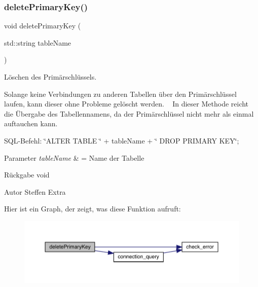 \subsubsection{delete\+Primary\+Key()}
{\footnotesize\ttfamily void delete\+Primary\+Key (\begin{DoxyParamCaption}\item[{std\+::string}]{table\+Name }\end{DoxyParamCaption})}



Löschen des Primärschlüssels. 

Solange keine Verbindungen zu anderen Tabellen über den Primärschlüssel laufen, kann dieser ohne Probleme gelöscht werden. ~\newline
 In dieser Methode reicht die Übergabe des Tabellennamens, da der Primärschlüssel nicht mehr als einmal auftauchen kann. ~\newline


S\+Q\+L-\/\+Befehl\+: \char`\"{}\+A\+L\+T\+E\+R T\+A\+B\+L\+E \char`\"{} + table\+Name + \char`\"{} D\+R\+O\+P P\+R\+I\+M\+A\+R\+Y K\+E\+Y\char`\"{};


\begin{DoxyParams}{Parameter}
{\em table\+Name} & = Name der Tabelle\\
\hline
\end{DoxyParams}
\begin{DoxyReturn}{Rückgabe}
void
\end{DoxyReturn}
\begin{DoxyAuthor}{Autor}
Steffen Extra 
\end{DoxyAuthor}
Hier ist ein Graph, der zeigt, was diese Funktion aufruft\+:\nopagebreak
\begin{figure}[H]
\begin{center}
\leavevmode
\includegraphics[width=350pt]{tables_8hpp_a36d0f9bb1b86a8155d7551fcd014b4da_cgraph}
\end{center}
\end{figure}
\mbox{\label{tables_8hpp_aee892818f06208ce4b68fb7598a7494c}} 

